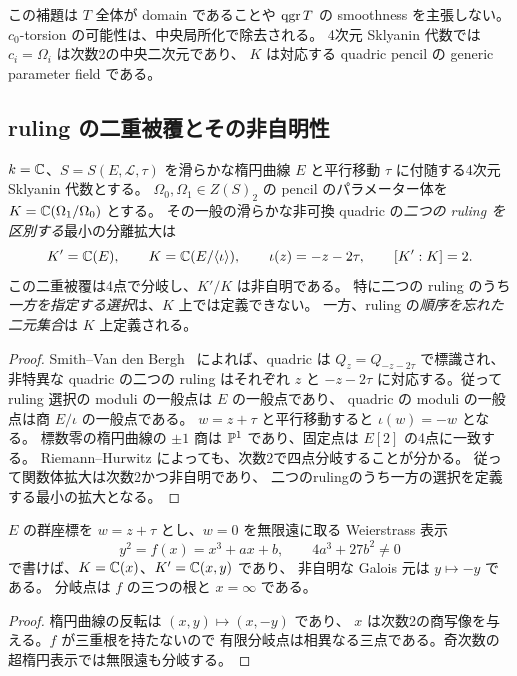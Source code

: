\begin{remark}
この補題は $T$ 全体が domain であることや $\operatorname{qgr} T$ の smoothness を主張しない。
$c_0$-torsion の可能性は、中央局所化で除去される。
4次元 Sklyanin 代数では $c_i=\Omega_i$ は次数2の中央二次元であり、
$K$ は対応する quadric pencil の generic parameter field である。
\end{remark}

\subsection{ruling の二重被覆とその非自明性}
\begin{theorem}\label{thm:sklyanin-ruling-cover}
$k=\mathbb C$、$S=S(E,\mathcal L,\tau)$ を滑らかな楕円曲線 $E$ と平行移動 $\tau$
に付随する4次元 Sklyanin 代数とする。
$\Omega_0,\Omega_1\in Z(S)_2$ の pencil のパラメーター体を
$K=\mathbb C(\Omega_1/\Omega_0)$ とする。
その一般の滑らかな非可換 quadric の\emph{二つの ruling を区別する}最小の分離拡大は
\[
 K'=\mathbb C(E),\qquad K=\mathbb C(E/\langle\iota\rangle),
 \qquad \iota(z)=-z-2\tau,
 \qquad [K':K]=2.
\]
この二重被覆は4点で分岐し、$K'/K$ は非自明である。
特に二つの ruling のうち\emph{一方を指定する選択}は、$K$ 上では定義できない。
一方、ruling の\emph{順序を忘れた二元集合}は $K$ 上定義される。
\end{theorem}
\begin{proof}
Smith--Van den Bergh~\cite[第10.3--10.4節、命題10.1、定理10.2]{SmithVdB}
によれば、quadric は $Q_z=Q_{-z-2\tau}$ で標識され、
非特異な quadric の二つの ruling はそれぞれ $z$ と $-z-2\tau$
に対応する。従って ruling 選択の moduli の一般点は $E$ の一般点であり、
quadric の moduli の一般点は商 $E/\iota$ の一般点である。
$w=z+\tau$ と平行移動すると $\iota(w)=-w$ となる。
標数零の楕円曲線の $\pm1$ 商は $\mathbb P^1$ であり、固定点は $E[2]$ の4点に一致する。
Riemann--Hurwitz によっても、次数2で四点分岐することが分かる。
従って関数体拡大は次数2かつ非自明であり、
二つのrulingのうち一方の選択を定義する最小の拡大となる。
\end{proof}

\begin{corollary}[Weierstrass 表示]\label{cor:ruling-weierstrass}
$E$ の群座標を $w=z+\tau$ とし、$w=0$ を無限遠に取る Weierstrass 表示
\[
 y^2=f(x)=x^3+ax+b,
 \qquad 4a^3+27b^2\ne0
\]
で書けば、$K=\mathbb C(x)$、$K'=\mathbb C(x,y)$ であり、
非自明な Galois 元は $y\mapsto-y$ である。
分岐点は $f$ の三つの根と $x=\infty$ である。
\end{corollary}
\begin{proof}
楕円曲線の反転は $(x,y)\mapsto(x,-y)$ であり、
$x$ は次数2の商写像を与える。$f$ が三重根を持たないので
有限分岐点は相異なる三点である。奇次数の超楕円表示では無限遠も分岐する。
\end{proof}


